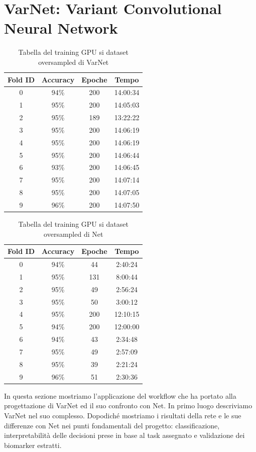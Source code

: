 \section{VarNet: Variant Convolutional Neural Network}
\begin{table}[htbp]
	\centering
	\caption{Tabella del training GPU si dataset oversampled di VarNet}
	\begin{tabular}{cccc}
		\toprule
		Fold ID & Accuracy & Epoche & Tempo \\
		\midrule
		      0 & 94\% & 200 & 14:00:34 \\
            1 & 95\% & 200 & 14:05:03 \\
            2 & 95\% & 189 & 13:22:22 \\
            3 & 95\% & 200 & 14:06:19 \\
            4 & 95\% & 200 & 14:06:19 \\
            5 & 95\% & 200 & 14:06:44 \\
            6 & 93\% & 200 & 14:06:45 \\
            7 & 95\% & 200 & 14:07:14 \\
            8 & 95\% & 200 & 14:07:05 \\
            9 & 96\% & 200 & 14:07:50 \\
		\bottomrule
	\end{tabular}
	\label{table:GPU-varnet}
\end{table}

\begin{table}[htbp]
	\centering
	\caption{Tabella del training GPU si dataset oversampled di Net}
	\begin{tabular}{cccc}
		\toprule
		Fold ID & Accuracy & Epoche & Tempo \\
		\midrule
		0 & 94\% & 44 & 2:40:24 \\
            1 & 95\% & 131 & 8:00:44 \\
            2 & 95\% & 49 & 2:56:24 \\
            3 & 95\% & 50 & 3:00:12 \\
            4 & 95\% & 200 & 12:10:15 \\
            5 & 94\% & 200 & 12:00:00 \\
            6 & 94\% & 43 & 2:34:48 \\
            7 & 95\% & 49 & 2:57:09 \\
            8 & 95\% & 39 & 2:21:24 \\
            9 & 96\% & 51 & 2:30:36 \\
		\bottomrule
	\end{tabular}
	\label{table:GPU-Net}
\end{table}
\label{sec:varnet}
In questa sezione mostriamo l'applicazione del workflow che ha portato alla progettazione di VarNet ed il suo confronto
con Net. In primo luogo descriviamo VarNet nel suo complesso. Dopodiché mostriamo i risultati della rete e le sue
differenze con Net nei punti fondamentali del progetto: classificazione, interpretabilità delle decisioni prese in 
base al task assegnato e validazione dei biomarker estratti.

